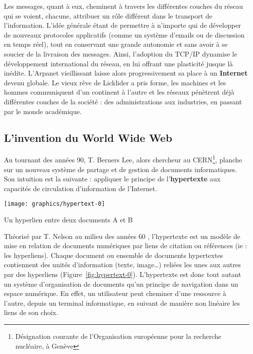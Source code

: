 \documentclass[symmetric,justified,marginals=raggedouter]{tufte-book}
\begin{document}
\noindent Les messages, quant à eux, cheminent à travers les différentes cou\-ches du réseau qui se voient, chacune, attribuer un rôle différent dans le transport de l'information. L'idée générale étant de permettre à n'importe qui de développer de nouveaux protocoles applicatifs (com\-me un système d'emails ou de discussion en temps réel), tout en conservant une grande autonomie et sans avoir à se soucier de la livraison des messages. Ainsi, l'adoption du TCP/IP dynamise le développement international du réseau, en lui offrant une plasticité jusque là inédite. L'Arpanet vieillissant laisse alors progressivement sa place à un \textbf{Internet} devenu globale. Le vieux rêve de Licklider a pris forme, les machines et les hommes communiquent d'un continent à l'autre et les réseaux pénètrent déjà différentes couches de la société : des administrations aux industries, en passant par le monde académique. \\

\subsection{L'invention du World Wide Web} 

\noindent Au tournant des années 90, T. Berners Lee, alors chercheur au CERN\footnote{\RaggedOuter Désignation courante de l'Organisation européenne pour la recherche nucléaire, à Genève}, planche sur un nouveau système de partage et de gestion de documents informatiques. Son intuition est la suivante : appliquer le principe de l'\textbf{hypertexte} aux capacités de circulation d'information de l'Internet. 

\begin{marginfigure}%
  \texttt{[image: graphics/hypertext-0]}
  \vspace*{0.2cm}  
  \caption{Un hyperlien entre deux documents A et B}
  \label{fig:hypertext-0}
\end{marginfigure} 

Théorisé par T. Nelson au milieu des années 60 \citep{nelson_getting_1967}, l'hypertexte est un modèle de mise en relation de documents numé\-riques par liens de citation ou références (ie : les hyperliens). Chaque document ou ensemble de documents hypertextes contiennent des unités d'information (texte, image\ldots{}) reliées les unes aux autres par des hyperliens (Figure~\ref{fig:hypertext-0}). L'hypertexte est donc tout autant un système d'organisation de documents qu'un principe de navigation dans un espace numérique. En effet, un utilisateur peut cheminer d'une ressource à l'autre, depuis un terminal informatique, en suivant de manière non linéaire les liens de son choix. 
\end{document}
